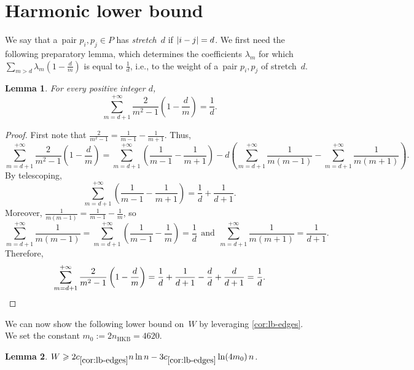 \documentclass[11pt,a4paper]{article}
\let\qedhere\relax
\newtheorem{lemma}{Lemma}
\newcommand{\hkb}{n_{\mathrm{HKB}}}
\begin{document}
\section{Harmonic lower bound}

We say that a~pair $p_i, p_j \in P$ has \emph{stretch}~$d$ if $\mathopen| i-j \mathclose|=d$.
We first need the following preparatory lemma, which determines the coefficients $\lambda_m$ for which $\sum_{m > d} \lambda_m \left(1-\frac{d}{m}\right)$ is equal to $\frac{1}{d}$, i.e., to the weight of a~pair $p_i, p_j$ of stretch~$d$.

\begin{lemma}\label{lem:telescoping}
  For every positive integer $d$, \[\sum\limits_{m = d+1}^{+\infty} \frac{2}{m^2-1} \left(1-\frac{d}{m}\right) = \frac{1}{d}.\]
\end{lemma}

\begin{proof}
  First note that $\frac{2}{m^2-1} = \frac{1}{m-1} - \frac{1}{m+1}$.
  Thus,
  \[\sum\limits_{m = d+1}^{+\infty} \frac{2}{m^2-1} \left(1-\frac{d}{m}\right) = \sum\limits_{m = d+1}^{+\infty} \left(\frac{1}{m-1} - \frac{1}{m+1}\right) - d \left( \sum\limits_{m = d+1}^{+\infty} \frac{1}{m(m-1)} - \sum\limits_{m = d+1}^{+\infty} \frac{1}{m(m+1)} \right).\]
  By telescoping, 
  \[\sum\limits_{m = d+1}^{+\infty} \left(\frac{1}{m-1} - \frac{1}{m+1}\right) = \frac{1}{d} + \frac{1}{d+1}.\]
  Moreover, $\frac{1}{m(m-1)}=\frac{1}{m-1} - \frac{1}{m}$, so
  \[ \sum\limits_{m = d+1}^{+\infty} \frac{1}{m(m-1)} = \sum\limits_{m = d+1}^{+\infty} \left(\frac{1}{m-1} - \frac{1}{m}\right) = \frac{1}{d}~~\text{and}~~\sum\limits_{m = d+1}^{+\infty} \frac{1}{m(m+1)}= \frac{1}{d+1}.\]
  Therefore,
  \[\sum\limits_{m = d+1}^{+\infty} \frac{2}{m^2-1} \left(1-\frac{d}{m}\right) = \frac{1}{d} + \frac{1}{d+1} - \frac{d}{d} + \frac{d}{d+1} = \frac{1}{d}.\qedhere\]
\end{proof}

We can now show the following lower bound on~$W$ by leveraging \cref{cor:lb-edges}.
We set the constant $m_0 := 2 \hkb = 4620$.

\begin{lemma}\label{lem:lb-W}
  $W \geqslant 2 c_{\ref{cor:lb-edges}} n \ln n - 3c_{\ref{cor:lb-edges}} \ln(4m_0)\,n$.
\end{lemma}
\end{document}
